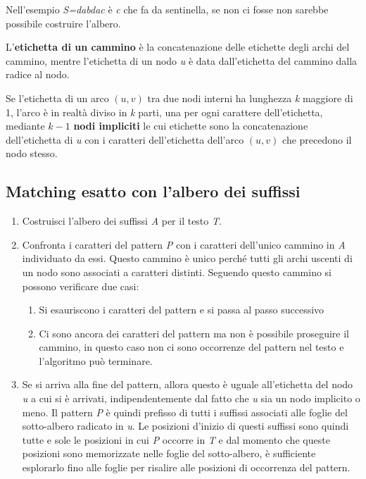 Nell'esempio \emph{S=dabdac} è \emph{c} che fa da sentinella, se non ci fosse non sarebbe possibile costruire l'albero.

L'\textbf{etichetta di un cammino} è la concatenazione delle etichette degli archi del cammino, mentre l'etichetta di un nodo \emph{u} è data dall'etichetta del cammino dalla radice al nodo.

Se l'etichetta di un arco $ (u,v) $ tra due nodi interni ha lunghezza \textit{k} maggiore di 1, l'arco è in realtà diviso in \textit{k} parti, una per ogni carattere dell'etichetta, mediante $ k-1 $ \textbf{nodi impliciti} le cui etichette sono la concatenazione dell'etichetta di \textit{u} con i caratteri dell'etichetta dell'arco $ (u,v) $ che precedono il nodo stesso.

\subsection{Matching esatto con l'albero dei suffissi}\label{matching-esatto-con-lalbero-dei-suffissi}

\begin{enumerate}
	\item Costruisci l'albero dei suffissi \textit{A} per il testo \textit{T}.
	\item Confronta i caratteri del pattern \textit{P} con i caratteri dell'unico cammino in \textit{A} individuato da essi. Questo cammino è unico perché tutti gli archi uscenti di un nodo sono associati a caratteri distinti. Seguendo questo cammino si possono verificare due casi:
	\begin{enumerate}
		\item Si esauriscono i caratteri del pattern e si passa al passo successivo
		\item Ci sono ancora dei caratteri del pattern ma non è possibile proseguire il cammino, in questo caso non ci sono occorrenze del pattern nel testo e l'algoritmo può terminare.
	\end{enumerate}
	\item Se si arriva alla fine del pattern, allora questo è uguale all'etichetta del nodo \textit{u} a cui si è arrivati, indipendentemente dal fatto che \textit{u} sia un nodo implicito o meno. Il pattern \textit{P} è quindi prefisso di tutti i suffissi associati alle foglie del sotto-albero radicato in \textit{u}. Le posizioni d'inizio di questi suffissi sono quindi tutte e sole le posizioni in cui \textit{P} occorre in \textit{T} e dal momento che queste posizioni sono memorizzate nelle foglie del sotto-albero, è sufficiente esplorarlo fino alle foglie per risalire alle posizioni di occorrenza del pattern.
\end{enumerate}

